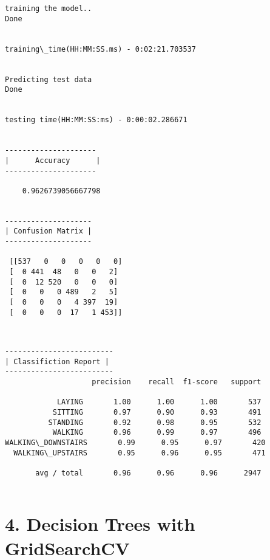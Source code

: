 \documentclass[11pt]{article}
\begin{document}
    \begin{Verbatim}[commandchars=\\\{\}]
training the model..
Done 
 

training\_time(HH:MM:SS.ms) - 0:02:21.703537


Predicting test data
Done 
 

testing time(HH:MM:SS:ms) - 0:00:02.286671


---------------------
|      Accuracy      |
---------------------

    0.9626739056667798


--------------------
| Confusion Matrix |
--------------------

 [[537   0   0   0   0   0]
 [  0 441  48   0   0   2]
 [  0  12 520   0   0   0]
 [  0   0   0 489   2   5]
 [  0   0   0   4 397  19]
 [  0   0   0  17   1 453]]

    \end{Verbatim}

    \begin{center}
    \end{center}
    { \hspace*{\fill} \\}
    
    \begin{Verbatim}[commandchars=\\\{\}]
-------------------------
| Classifiction Report |
-------------------------
                    precision    recall  f1-score   support

            LAYING       1.00      1.00      1.00       537
           SITTING       0.97      0.90      0.93       491
          STANDING       0.92      0.98      0.95       532
           WALKING       0.96      0.99      0.97       496
WALKING\_DOWNSTAIRS       0.99      0.95      0.97       420
  WALKING\_UPSTAIRS       0.95      0.96      0.95       471

       avg / total       0.96      0.96      0.96      2947


    \end{Verbatim}

    \section{4. Decision Trees with
GridSearchCV}\label{decision-trees-with-gridsearchcv}
\end{document}
